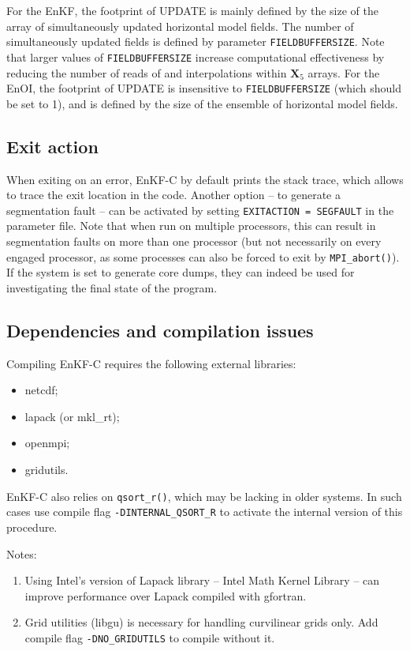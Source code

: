 \documentclass[11pt]{report}
\newcommand{\mb} {\mathbf}
\begin{document}
For the EnKF, the footprint of UPDATE is mainly defined by the size of the array of simultaneously updated horizontal model fields.
The number of simultaneously updated fields is defined by parameter \verb|FIELDBUFFERSIZE|.
Note that larger values of \verb|FIELDBUFFERSIZE| increase computational effectiveness by reducing the number of reads of and interpolations within $\mb X_5$ arrays.
For the EnOI, the footprint of UPDATE is insensitive to \verb|FIELDBUFFERSIZE| (which should be set to 1), and is defined by the size of the ensemble of horizontal model fields.

\subsection{Exit action}

When exiting on an error, EnKF-C by default prints the stack trace, which allows to trace the exit location in the code.
Another option -- to generate a segmentation fault -- can be activated by setting \verb|EXITACTION = SEGFAULT| in the parameter file.
Note that when run on multiple processors, this can result in segmentation faults on more than one processor (but not necessarily on every engaged processor, as some processes can also be forced to exit by \verb|MPI_abort()|).
If the system is set to generate core dumps, they can indeed be used for investigating the final state of the program.

\subsection{Dependencies and compilation issues}

Compiling EnKF-C requires the following external libraries:
\begin{itemize}
\item netcdf;
\item lapack (or mkl\_rt);
\item openmpi;
\item gridutils.
\end{itemize}

EnKF-C also relies on \verb|qsort_r()|, which may be lacking in older systems.
In such cases use compile flag \verb|-DINTERNAL_QSORT_R| to activate the internal version of this procedure.

Notes:
\vspace{-3mm}
\begin{enumerate}
\item Using Intel's version of Lapack library -- Intel Math Kernel Library -- can improve performance over Lapack compiled with gfortran.
\item Grid  utilities (libgu) is necessary for handling curvilinear grids only.
Add compile flag \verb|-DNO_GRIDUTILS| to compile without it.
\end{enumerate}
\end{document}
